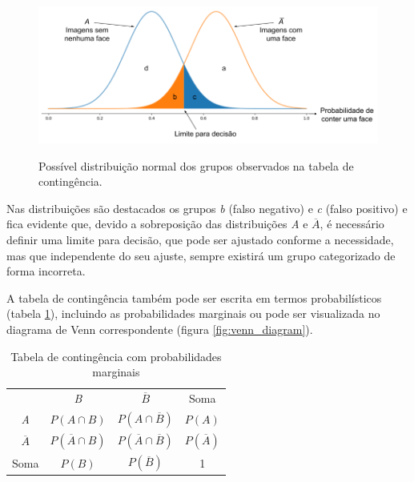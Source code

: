 \begin{figure}[htbp]
    \centering
    \caption{Possível distribuição normal dos grupos observados na tabela de contingência.}
    \includegraphics[scale=.5]{figs/norm_dist.png}
    \label{fig:norm_dist}
 \end{figure}

 Nas distribuições são destacados os grupos \textit{b} (falso negativo) e \textit{c} (falso positivo) e fica evidente que, devido a sobreposição das distribuições \textit{A} e $\overline{A}$, é necessário definir uma limite para decisão, que pode ser ajustado conforme a necessidade, mas que independente do seu ajuste, sempre existirá um grupo categorizado de forma incorreta.

 A tabela de contingência também pode ser escrita em termos probabilísticos (tabela \ref{tab:tabela_contingencia_probab}), incluindo as probabilidades marginais ou pode ser visualizada no diagrama de Venn correspondente (figura \ref{fig:venn_diagram}).

\begin{table}[htbp]
    \caption{Tabela de contingência com probabilidades marginais}
    \label{tab:tabela_contingencia_probab}
    \centering
    \begin{tabular}{cccc}\hline\hline
        & \textit{B} & $\overline{B}$ & Soma\\
    \textit{A} & $P(A \cap B)$ & $P(A \cap \overline{B})$ & $P(A)$ \\
    $\overline{A}$ & $P(\overline{A} \cap B)$ & $P(\overline{A} \cap \overline{B})$ & $P(\overline{A})$ \\
    Soma & $P(B)$ & $P(\overline{B})$ & 1 \\
    \hline\hline
    \end{tabular}
\end{table}

